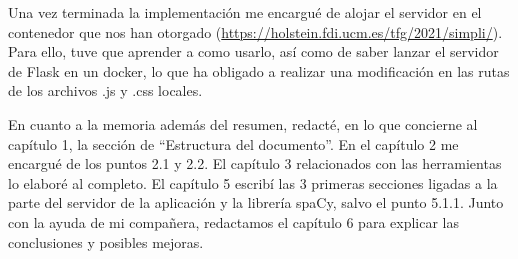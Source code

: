 Una vez terminada la implementación me encargué de alojar el servidor en el contenedor que nos han otorgado (\url{https://holstein.fdi.ucm.es/tfg/2021/simpli/}). Para ello, tuve que aprender a como usarlo, así como de saber lanzar el servidor de Flask en un docker, lo que ha obligado a realizar una modificación en las rutas de los archivos .js y .css locales.

En cuanto a la memoria además del resumen, redacté, en lo que concierne al capítulo 1, la sección de ``Estructura del documento''. En el capítulo 2  me encargué de los puntos 2.1 y 2.2. El capítulo 3 relacionados con las herramientas lo elaboré al completo. El capítulo 5 escribí las 3 primeras secciones ligadas a la parte del servidor de la aplicación y la librería spaCy, salvo el punto 5.1.1. Junto con la ayuda de mi compañera, redactamos el capítulo 6 para explicar las conclusiones y posibles mejoras.
